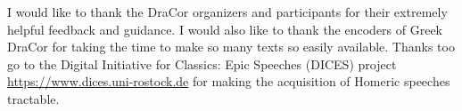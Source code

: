 %
%
%
%

I would like to thank the DraCor organizers and participants for
their extremely helpful feedback and guidance. I would also like
to thank the encoders of Greek DraCor for taking the time to
make so many texts so easily available. Thanks too go to the Digital
Initiative for Classics: Epic Speeches (DICES) project
\url{https://www.dices.uni-rostock.de} for making the acquisition of
Homeric speeches tractable.
